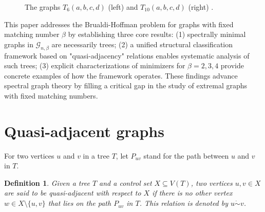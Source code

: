 \documentclass[12pt]{amsart}
\newtheorem{definition}{Definition}[section]
\begin{document}
\begin{figure}[h!]
\begin{minipage}{.45\linewidth}
\end{minipage}
\caption{The graphs $T_{6}(a,b,c,d)$ (left) and $T_{10}(a,b,c,d)$ (right) .}\label{fig-1.1}
\end{figure}


This paper addresses the Brualdi-Hoffman problem for graphs with fixed matching number \( \beta \) by establishing three core results: (1) spectrally minimal graphs in \( \mathcal{G}_{n,\beta} \) are necessarily trees; (2) a unified structural classification framework based on "quasi-adjacency" relations enables systematic analysis of such trees; (3) explicit characterizations of minimizers for \( \beta = 2, 3, 4 \) provide concrete examples of how the framework operates.
These findings advance spectral graph theory by filling a critical gap in the study of extremal graphs with fixed matching numbers. 


\section{Quasi-adjacent  graphs}\label{sec-2}
For two vertices $u$ and $v$ in a tree $T$, let \(P_{uv}\) stand for the path  between $u$ and $v$ in $T$.
\begin{definition}\label{quasi-adjacent}
Given a tree $T$ and a control set \(X \subseteq V(T)\), two vertices \(u, v \in X\) are said to be \textit{quasi-adjacent with respect to $X$} 
if there is no other vertex \(w \in X \setminus \{u, v\}\) that lies on the path \(P_{uv}\) in $T$. 
This relation is denoted by \(u \dot{\sim} v\).
\end{definition}
\end{document}
